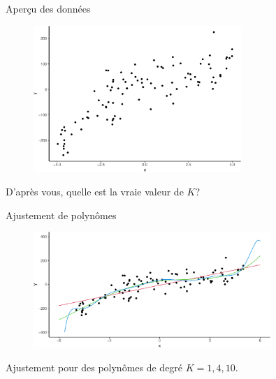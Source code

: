 \documentclass[
  ignorenonframetext,
]{beamer}
\begin{document}
\begin{frame}{Aperçu des données}
\protect\hypertarget{aperuxe7u-des-donnuxe9es}{}
\begin{figure}

{\centering \includegraphics[width=0.7\textwidth,height=\textheight]{MATH60602-diapos4_files/figure-beamer/unnamed-chunk-5-1.pdf}

}

\end{figure}

D'après vous, quelle est la vraie valeur de \(K\)?
\end{frame}

\begin{frame}{Ajustement de polynômes}
\protect\hypertarget{ajustement-de-polynuxf4mes}{}
\begin{figure}

{\centering \includegraphics[width=0.8\textwidth,height=\textheight]{MATH60602-diapos4_files/figure-beamer/unnamed-chunk-6-1.pdf}

}

\end{figure}

Ajustement pour des polynômes de degré \(K=1, 4, 10\).
\end{frame}
\end{document}
